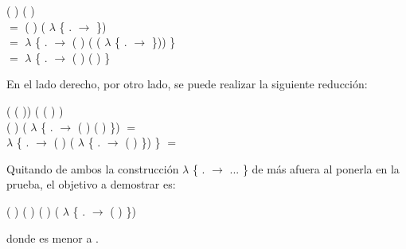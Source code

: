 \begin{AgdaAlign}
 ( \AgdaFunction{+}  ) (  \AgdaFunction{+} ) \\ 
$=$  ( ) ( $\lambda$ \{ . $\rightarrow$   \AgdaFunction{+}  \}) \\
$=$  $\lambda$ \{ . $\rightarrow$  ( ) ( ( $\lambda$ \{ . $\rightarrow$   \AgdaFunction{+}  \})) \}\\ 
$=$  $\lambda$ \{ . $\rightarrow$  ( ) (  \AgdaFunction{+} ) \}

En el lado derecho, por otro lado, se puede realizar la siguiente reducción:
\begin{flushright}
(  ( )) \AgdaFunction{+} ( ( ) ) \\
( ) \AgdaFunction{+} ( $\lambda$ \{ . $\rightarrow$  ( ) ( ) \}) $=$ \\
 $\lambda$ \{ . $\rightarrow$ ( ) \AgdaFunction{+} ( $\lambda$ \{ . $\rightarrow$  ( )  \}) \} $=$
\end{flushright}

Quitando de ambos la construcción  $\lambda$ \{ . $\rightarrow$ ... \} de más afuera al ponerla en la prueba, el objetivo a demostrar es: 
\begin{center}
\AgdaFunction{[}  \AgdaFunction{]}  ( ) (  \AgdaFunction{+} ) \AgdaFunction{$\leq$} ( ) \AgdaFunction{+} ( $\lambda$ \{ . $\rightarrow$  ( )  \})
\end{center}
donde  es menor a .


\end{AgdaAlign}
